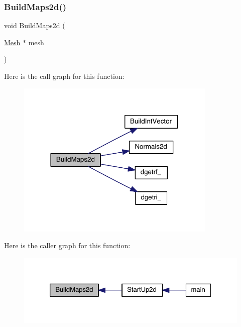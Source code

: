 \subsubsection{\texorpdfstring{Build\+Maps2d()}{BuildMaps2d()}}
{\footnotesize\ttfamily void Build\+Maps2d (\begin{DoxyParamCaption}\item[{\hyperlink{a00557_aeffbe0891ab73a4d8964c9cb7978426e}{Mesh} $\ast$}]{mesh }\end{DoxyParamCaption})}

Here is the call graph for this function\+:\nopagebreak
\begin{figure}[H]
\begin{center}
\leavevmode
\includegraphics[width=270pt]{a00554_ac0114aa8a9d094bad20943e1b79ba473_cgraph}
\end{center}
\end{figure}
Here is the caller graph for this function\+:\nopagebreak
\begin{figure}[H]
\begin{center}
\leavevmode
\includegraphics[width=326pt]{a00554_ac0114aa8a9d094bad20943e1b79ba473_icgraph}
\end{center}
\end{figure}
\mbox{\label{a00554_a0b7218104d1df7fc4acbe306edf10f98}} 
